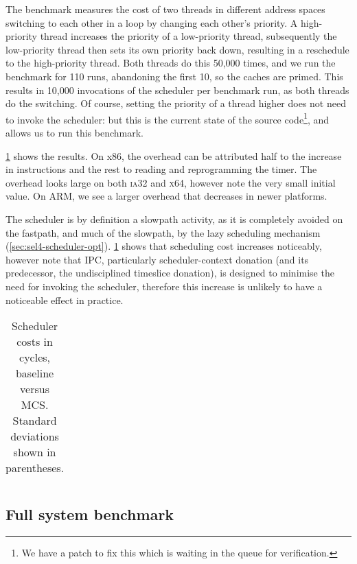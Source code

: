 The  benchmark measures the cost of two threads in different address spaces switching
to each other in a loop by changing each other's priority. A high-priority thread increases the priority of
a low-priority thread, subsequently the low-priority thread then sets its own priority back down, 
resulting in a reschedule to the high-priority thread. Both threads do this 50,000 times,
and we run the benchmark for 110 runs, abandoning the first 10, so the caches are primed.
This results in 10,000 invocations
of the scheduler per benchmark run, as both threads do the switching. Of course, setting the priority of
a thread higher does not need to invoke the scheduler: but this is the current state of the source
code\footnote{We have a patch to fix this which is waiting in the queue for verification.}, and
allows us to run this benchmark.

\cref{t:micro-schedule} shows the results. On x86, the overhead can be attributed half to the
increase in instructions and the rest to reading and reprogramming the timer. The overhead looks
large on both \textsc{ia32} and \textsc{x64}, however note the very small initial value. On ARM, 
we see a larger overhead that decreases in newer platforms.

The scheduler is by definition a slowpath activity, as it is completely avoided on the fastpath, and
much of the slowpath, by the lazy scheduling mechanism (\cref{sec:sel4-scheduler-opt}).
\cref{t:micro-schedule} shows that scheduling cost increases noticeably, however note that \selfour IPC,
particularly scheduler-context donation (and its predecessor, the
undisciplined timeslice donation), is designed to minimise the need for
invoking the scheduler, therefore this increase is unlikely to have
a noticeable effect in practice. 

\begin{table}[t]\centering
    \begin{tabularx}{\textwidth}{Xlllllll}\toprule

\end{tabularx}
\caption[Slowpath scheduler costs.]{Scheduler costs in cycles, baseline \selfour 
versus MCS. Standard deviations shown in parentheses.}
\label{t:micro-schedule}
\end{table}

\subsection{Full system benchmark}
\label{s:evaluation-redis-overhead}

